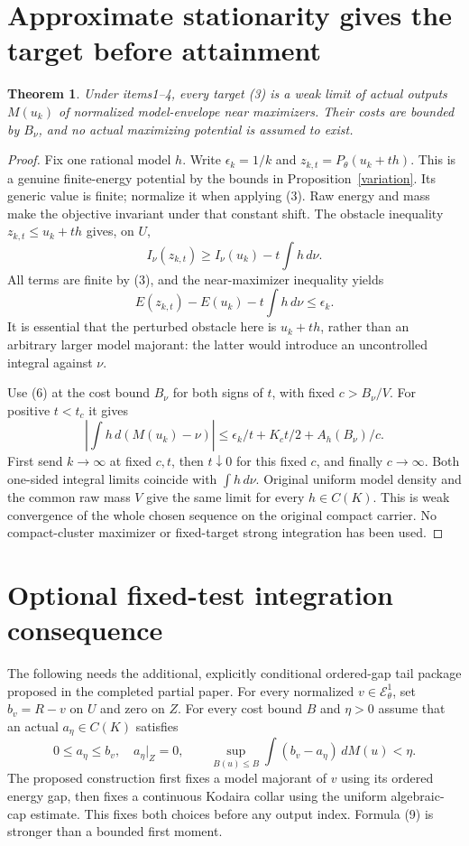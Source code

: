 \documentclass[11pt]{article}
\newtheorem{theorem}{Theorem}
\newcommand{\EE}{\mathcal E^1_\theta}
\begin{document}
\section{Approximate stationarity gives the target before attainment}
\begin{theorem}\label{approx}
Under items1--4, every target (3) is a weak limit of actual outputs
$M(u_k)$ of normalized model-envelope near maximizers. Their costs
are bounded by $B_\nu$, and no actual maximizing potential is
assumed to exist.
\end{theorem}
\begin{proof}
Fix one rational model $h$. Write $\epsilon_k=1/k$ and
$z_{k,t}=P_\theta(u_k+th)$. This is a genuine finite-energy
potential by the bounds in Proposition~\ref{variation}. Its generic
value is finite; normalize it when applying (3). Raw energy and mass
make the objective invariant under that constant shift.
The obstacle inequality $z_{k,t}\leq u_k+th$ gives, on $U$,
\[
 I_\nu(z_{k,t})\geq I_\nu(u_k)-t\int h\,d\nu.
\]
All terms are finite by (3), and the near-maximizer inequality yields
\[
 E(z_{k,t})-E(u_k)-t\int h\,d\nu\leq\epsilon_k.             \tag{7}
\]
It is essential that the perturbed obstacle here is $u_k+th$,
rather than an arbitrary larger model majorant: the latter would
introduce an uncontrolled integral against $\nu$.

Use (6) at the cost bound $B_\nu$ for both signs of $t$, with
fixed $c>B_\nu/V$. For positive $t<t_c$ it gives
\[
 \left|\int h\,d(M(u_k)-\nu)\right|
 \leq\epsilon_k/t+K_ct/2+A_h(B_\nu)/c.                    \tag{8}
\]
First send $k\to\infty$ at fixed $c,t$, then $t\downarrow0$
for this fixed $c$, and finally $c\to\infty$.
Both one-sided integral limits coincide with $\int h\,d\nu$.
Original uniform model density and the common raw mass $V$ give
the same limit for every $h\in C(K)$. This is weak convergence of
the whole chosen sequence on the original compact carrier.
No compact-cluster maximizer or fixed-target strong integration
has been used.
\end{proof}

\section{Optional fixed-test integration consequence}
The following needs the additional, explicitly conditional ordered-gap
tail package proposed in the completed partial paper. For every
normalized $v\in\EE$, set $b_v=R-v$ on $U$ and zero on $Z$.
For every cost bound $B$ and $\eta>0$ assume that an actual
$a_\eta\in C(K)$ satisfies
\[
 0\leq a_\eta\leq b_v,\quad a_\eta|_Z=0,\qquad
 \sup_{B(u)\leq B}\int(b_v-a_\eta)\,dM(u)<\eta.             \tag{9}
\]
The proposed construction first fixes a model majorant of $v$ using
its ordered energy gap, then fixes a continuous Kodaira collar using
the uniform algebraic-cap estimate. This fixes both choices before
any output index. Formula (9) is stronger than a bounded first moment.
\end{document}
